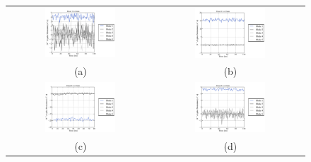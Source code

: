 \documentclass[10pt,fleqn,a4paper]{article}
\begin{document}
\begin{figure}[h]
\begin{tabular}{cc}
 \includegraphics[width=0.5\textwidth]{./imgs/Lz_H1L2.pdf} & \includegraphics[width=0.5\textwidth]{./imgs/Lz_H1L12.pdf} \\
 (a) & (b) \\
 \includegraphics[width=0.5\textwidth]{./imgs/Lz_H2L12.pdf} & \includegraphics[width=0.5\textwidth]{./imgs/Lz_H3L12.pdf} \\
(c) & (d) \\

\end{tabular}
\end{figure}
\end{document}
